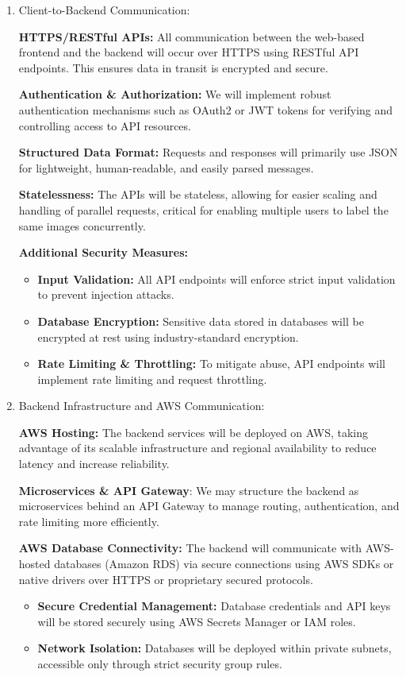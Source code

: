 \documentclass[12pt, titlepage]{article}
\begin{document}
\begin{enumerate}
    \item Client-to-Backend Communication:

        \textbf{HTTPS/RESTful APIs:} All communication between the web-based frontend and the backend will occur over HTTPS using RESTful API endpoints. This ensures data in transit is encrypted and secure.
    
        \textbf{Authentication \& Authorization:} We will implement robust authentication mechanisms such as OAuth2 or JWT tokens for verifying and controlling access to API resources.
    
        \textbf{Structured Data Format:} Requests and responses will primarily use JSON for lightweight, human-readable, and easily parsed messages.
    
        \textbf{Statelessness:} The APIs will be stateless, allowing for easier scaling and handling of parallel requests, critical for enabling multiple users to label the same images concurrently.
        
        \textbf{Additional Security Measures:} 

        \begin{itemize}
            \item \textbf{Input Validation:} All API endpoints will enforce strict input validation to prevent injection attacks.
            \item \textbf{Database Encryption:} Sensitive data stored in databases will be encrypted at rest using industry-standard encryption.
            \item \textbf{Rate Limiting \& Throttling:} To mitigate abuse, API endpoints will implement rate limiting and request throttling.
        \end{itemize}
        
    \item Backend Infrastructure and AWS Communication: 

        \textbf{AWS Hosting:} The backend services will be deployed on AWS, taking advantage of its scalable infrastructure and regional availability to reduce latency and increase reliability.
        
        \textbf{Microservices \& API Gateway}: We may structure the backend as microservices behind an API Gateway to manage routing, authentication, and rate limiting more efficiently.

        \textbf{AWS Database Connectivity:} The backend will communicate with AWS-hosted databases (Amazon RDS) via secure connections using AWS SDKs or native drivers over HTTPS or proprietary secured protocols.
        \begin{itemize}
            \item \textbf{Secure Credential Management:} Database credentials and API keys will be stored securely using AWS Secrets Manager or IAM roles.
            \item \textbf{Network Isolation:} Databases will be deployed within private subnets, accessible only through strict security group rules.
        \end{itemize}
\end{enumerate}
\end{document}
